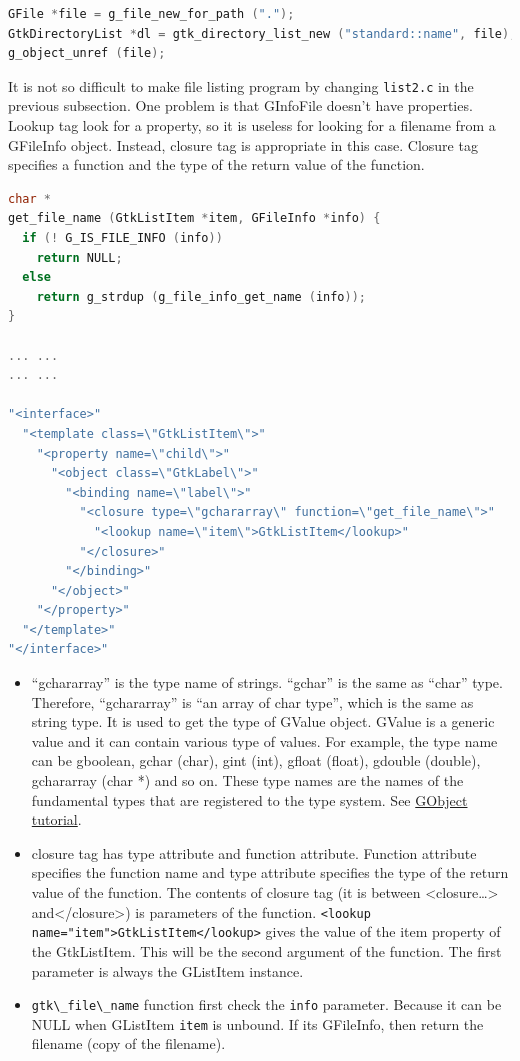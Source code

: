 \begin{lstlisting}[language=C]
GFile *file = g_file_new_for_path (".");
GtkDirectoryList *dl = gtk_directory_list_new ("standard::name", file);
g_object_unref (file);
\end{lstlisting}

It is not so difficult to make file listing program by changing
\passthrough{\lstinline!list2.c!} in the previous subsection. One
problem is that GInfoFile doesn't have properties. Lookup tag look for a
property, so it is useless for looking for a filename from a GFileInfo
object. Instead, closure tag is appropriate in this case. Closure tag
specifies a function and the type of the return value of the function.

\begin{lstlisting}[language=C]
char *
get_file_name (GtkListItem *item, GFileInfo *info) {
  if (! G_IS_FILE_INFO (info))
    return NULL;
  else
    return g_strdup (g_file_info_get_name (info));
}

... ...
... ...

"<interface>"
  "<template class=\"GtkListItem\">"
    "<property name=\"child\">"
      "<object class=\"GtkLabel\">"
        "<binding name=\"label\">"
          "<closure type=\"gchararray\" function=\"get_file_name\">"
            "<lookup name=\"item\">GtkListItem</lookup>"
          "</closure>"
        "</binding>"
      "</object>"
    "</property>"
  "</template>"
"</interface>"
\end{lstlisting}

\begin{itemize}
\tightlist
\item
  ``gchararray'' is the type name of strings. ``gchar'' is the same as
  ``char'' type. Therefore, ``gchararray'' is ``an array of char type'',
  which is the same as string type. It is used to get the type of GValue
  object. GValue is a generic value and it can contain various type of
  values. For example, the type name can be gboolean, gchar (char), gint
  (int), gfloat (float), gdouble (double), gchararray (char *) and so
  on. These type names are the names of the fundamental types that are
  registered to the type system. See
  \href{https://github.com/ToshioCP/Gobject-tutorial/blob/main/gfm/sec5.md\#gvalue}{GObject
  tutorial}.
\item
  closure tag has type attribute and function attribute. Function
  attribute specifies the function name and type attribute specifies the
  type of the return value of the function. The contents of closure tag
  (it is between \textless closure\ldots\textgreater{}
  and\textless/closure\textgreater) is parameters of the function.
  \passthrough{\lstinline!<lookup name="item">GtkListItem</lookup>!}
  gives the value of the item property of the GtkListItem. This will be
  the second argument of the function. The first parameter is always the
  GListItem instance.
\item
  \passthrough{\lstinline!gtk\_file\_name!} function first check the
  \passthrough{\lstinline!info!} parameter. Because it can be NULL when
  GListItem \passthrough{\lstinline!item!} is unbound. If its GFileInfo,
  then return the filename (copy of the filename).
\end{itemize}

